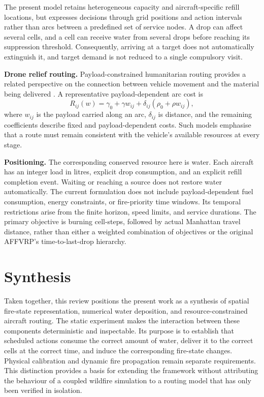 The present model retains heterogeneous capacity and aircraft-specific refill locations, but expresses decisions through grid positions and action intervals rather than arcs between a predefined set of service nodes. A drop can affect several cells, and a cell can receive water from several drops before reaching its suppression threshold. Consequently, arriving at a target does not automatically extinguish it, and target demand is not reduced to a single compulsory visit.

\textbf{Drone relief routing.} Payload-constrained humanitarian routing provides a related perspective on the connection between vehicle movement and the material being delivered \cite{rabta2018drone}. A representative payload-dependent arc cost is
\begin{equation}
    R_{ij}(w) = \gamma_0 + \gamma w_{ij}
    + \delta_{ij}\left(\rho_0 + \rho w_{ij}\right),
\end{equation}
where $w_{ij}$ is the payload carried along an arc, $\delta_{ij}$ is distance, and the remaining coefficients describe fixed and payload-dependent costs. Such models emphasise that a route must remain consistent with the vehicle's available resources at every stage.

\textbf{Positioning.} The corresponding conserved resource here is water. Each aircraft has an integer load in litres, explicit drop consumption, and an explicit refill completion event. Waiting or reaching a source does not restore water automatically. The current formulation does not include payload-dependent fuel consumption, energy constraints, or fire-priority time windows. Its temporal restrictions arise from the finite horizon, speed limits, and service durations. The primary objective is burning cell-steps, followed by actual Manhattan travel distance, rather than either a weighted combination of objectives or the original AFFVRP's time-to-last-drop hierarchy.

\section{Synthesis}
\label{sec:lit-synthesis}

Taken together, this review positions the present work as a synthesis of spatial fire-state representation, numerical water deposition, and resource-constrained aircraft routing. The static experiment makes the interaction between these components deterministic and inspectable. Its purpose is to establish that scheduled actions consume the correct amount of water, deliver it to the correct cells at the correct time, and induce the corresponding fire-state changes. Physical calibration and dynamic fire propagation remain separate requirements. This distinction provides a basis for extending the framework without attributing the behaviour of a coupled wildfire simulation to a routing model that has only been verified in isolation.
